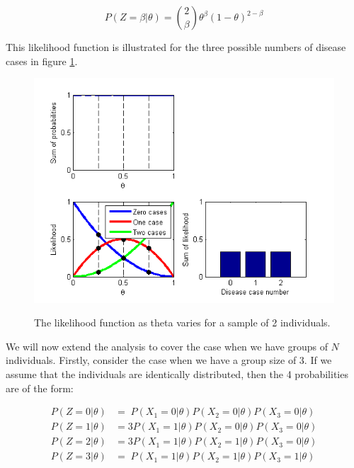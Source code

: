 \documentclass[11pt,fullpage]{book}
\begin{document}
\begin{equation}\label{eq:Likelihood_binomialTwoFull}
P(Z=\beta|\theta) = {2 \choose \beta} \theta^\beta (1-\theta)^{2-\beta}
\end{equation}

This likelihood function is illustrated for the three possible numbers of disease cases in figure \ref{fig:Likelihood_binomial}.

\begin{figure}
\centering
\scalebox{0.75} 
{\includegraphics{likelihood_binomial.png}}
\caption{The likelihood function as theta varies for a sample of 2 individuals.}\label{fig:Likelihood_binomial}
\end{figure}

We will now extend the analysis to cover the case when we have groups of $N$ individuals. Firstly, consider the case when we have a group size of 3. If we assume that the individuals are identically distributed, then the 4 probabilities are of the form:

\begin{equation}\label{eq:Likelihood_binomialThreeProbsSimpler}
\begin{align}
P(Z = 0|\theta)& = \;P(X_1=0|\theta) P(X_2=0|\theta)  P(X_3=0|\theta)\\
P(Z = 1|\theta)& = 3P(X_1=1|\theta) P(X_2=0|\theta)  P(X_3=0|\theta)\\
P(Z = 2|\theta)& = 3P(X_1=1|\theta) P(X_2=1|\theta)  P(X_3=0|\theta)\\
P(Z = 3|\theta)& = \;P(X_1=1|\theta)P(X_2=1|\theta) P(X_3=1|\theta)
\end{align}
\end{equation}
\end{document}
